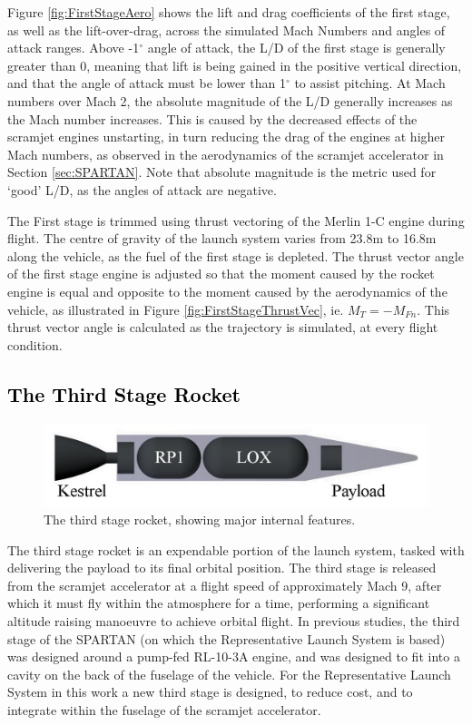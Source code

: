   Figure \ref{fig:FirstStageAero} shows the lift and drag coefficients of the first stage, as well as the lift-over-drag, across the simulated Mach Numbers and angles of attack ranges. Above -1$^\circ$ angle of attack, the L/D of the first stage is generally greater than 0, meaning that lift is being gained in the positive vertical direction, and that the angle of attack must be lower than 1$^\circ$ to assist pitching.
  At Mach numbers over Mach 2, the absolute magnitude of the L/D generally increases as the Mach number increases. This is caused by the decreased effects of the scramjet engines unstarting, in turn reducing the drag of the engines at higher Mach numbers, as observed in the aerodynamics of the scramjet accelerator in Section \ref{sec:SPARTAN}. 
   Note that absolute magnitude is the metric used for `good' L/D, as the angles of attack are negative. 
  
  
  The First stage is trimmed using thrust vectoring of the Merlin 1-C engine during flight. The centre of gravity of the launch system varies from 23.8m to 16.8m along the vehicle, as the fuel of the first stage is depleted. The thrust vector angle of the first stage engine is adjusted so that the moment caused by the rocket engine is equal and opposite to the moment caused by the aerodynamics of the vehicle, as illustrated in Figure \ref{fig:FirstStageThrustVec}, ie. $M_T = -M_{Fn}$.
  This thrust vector angle is calculated as the trajectory is simulated, at every flight condition. 

  
  
	
\newpage
	\textcolor{black}{\section{The Third Stage Rocket}\label{sec:ThirdStageBaseline}}
	\begin{figure}[H]
\centering
\includegraphics[width=0.7\linewidth]{figures/3_vehicle_design/3rdStage}
\caption{The third stage rocket, showing major internal features. }
\label{fig:3rdStage}
\end{figure}
\noindent
The third stage rocket is an expendable portion of the launch system, tasked with delivering the payload to its final orbital position. 
  The third stage is released from the scramjet accelerator at a flight speed of approximately Mach 9, after which it must fly within the atmosphere for a time, performing a significant altitude raising manoeuvre to achieve orbital flight\cite{Preller2017b}. 
  In previous studies, the third stage of the SPARTAN (on which the Representative Launch System is based) was designed around a pump-fed RL-10-3A engine\cite{Preller2017b}, and was designed to fit into a cavity on the back of the fuselage of the vehicle\cite{Preller2017b}. For the Representative Launch System in this work a new third stage is designed, to reduce cost, and to integrate within the fuselage of the scramjet accelerator. 
   

